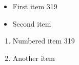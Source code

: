 \documentclass{article}
\begin{document}
\begin{itemize}
\item First item 319
\item Second item
\end{itemize}
\begin{enumerate}
\item Numbered item 319
\item Another item
\end{enumerate}
\end{document}
